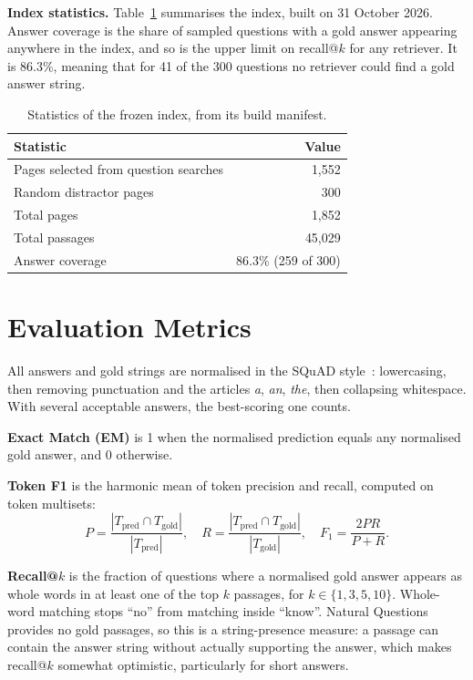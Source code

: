 \documentclass[11pt,a4paper]{article}
\begin{document}
\textbf{Index statistics.} Table~\ref{tab:index} summarises the index, built on 31 October 2026. Answer coverage is the share of sampled questions with a gold answer appearing anywhere in the index, and so is the upper limit on recall@$k$ for any retriever. It is 86.3\%, meaning that for 41 of the 300 questions no retriever could find a gold answer string.

\begin{table}[ht]
\centering
\begin{tabular}{@{}lr@{}}
\toprule
Statistic & Value \\
\midrule
Pages selected from question searches & 1,552 \\
Random distractor pages & 300 \\
Total pages & 1,852 \\
Total passages & 45,029 \\
Answer coverage & 86.3\% (259 of 300) \\
\bottomrule
\end{tabular}
\caption{Statistics of the frozen index, from its build manifest.}
\label{tab:index}
\end{table}

\section{Evaluation Metrics}

All answers and gold strings are normalised in the SQuAD style~\cite{squad}: lowercasing, then removing punctuation and the articles \emph{a}, \emph{an}, \emph{the}, then collapsing whitespace. With several acceptable answers, the best-scoring one counts.

\textbf{Exact Match (EM)} is 1 when the normalised prediction equals any normalised gold answer, and 0 otherwise.

\textbf{Token F1} is the harmonic mean of token precision and recall, computed on token multisets:
\begin{equation}
    P = \frac{|T_{\text{pred}} \cap T_{\text{gold}}|}{|T_{\text{pred}}|},\quad
    R = \frac{|T_{\text{pred}} \cap T_{\text{gold}}|}{|T_{\text{gold}}|},\quad
    F_1 = \frac{2PR}{P+R}.
\end{equation}

\textbf{Recall@$k$} is the fraction of questions where a normalised gold answer appears as whole words in at least one of the top $k$ passages, for $k \in \{1,3,5,10\}$. Whole-word matching stops ``no'' from matching inside ``know''. Natural Questions provides no gold passages, so this is a string-presence measure: a passage can contain the answer string without actually supporting the answer, which makes recall@$k$ somewhat optimistic, particularly for short answers.
\end{document}
